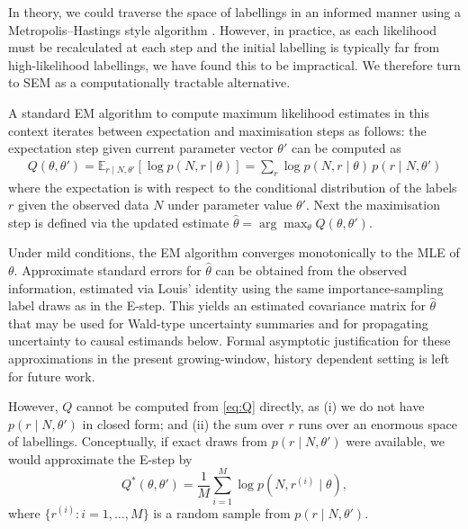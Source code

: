 \documentclass{statsoc}
\newcommand{\bbE}{\mathbb{E}}
\newcommand{\1}{\mathbbm{1}}
\begin{document}
In theory, we could traverse the space of labellings in an informed manner using a Metropolis--Hastings style algorithm \citep{hastings1970monte}. However, in practice, as each likelihood must be recalculated at each step and the initial labelling is typically far from high-likelihood labellings, we have found this to be impractical. We therefore turn to SEM as a computationally tractable alternative.

A standard EM algorithm to compute maximum likelihood estimates in this context iterates between expectation and maximisation steps as follows: the expectation step given current parameter vector $\theta'$ can be computed as
	\begin{align}
	Q(\theta,\theta') 
	= \bbE_{r \mid N, \theta'}\!\left[ \log p(N,r \mid \theta)\right]
	= \sum_{r} \log p(N,r \mid \theta)\, p(r \mid N, \theta')  \label{eq:Q}
	\end{align}
	where the expectation is with respect to the conditional distribution of the labels $r$ given the observed data $N$ under parameter value $\theta'$.
	Next the maximisation step is defined via the updated estimate
	\(
	\hat\theta = \arg\max_\theta Q(\theta,\theta').
	\)
    
Under mild conditions, the EM algorithm converges monotonically to the MLE of $\theta$. Approximate standard errors for \(\hat\theta\) can be obtained from the observed information, estimated via Louis' identity \citep{louis1982finding} using the same importance-sampling label draws as in the E-step. This yields an estimated covariance matrix for \(\hat\theta\) that may be used for Wald-type uncertainty summaries and for propagating uncertainty to causal estimands below. Formal asymptotic justification for these approximations in the present growing-window, history dependent setting is left for future work.

However, $Q$ cannot be computed from \eqref{eq:Q} directly, as (i) we do not have $p(r \mid N, \theta')$ in closed form; and (ii) the sum over $r$ runs over an enormous space of labellings. Conceptually, if exact draws from \(p(r\mid N,\theta')\) were available, we would approximate the E-step by
\begin{equation}
Q^*(\theta,\theta') = \frac{1}{M}\sum_{i=1}^M \log p(N,r^{(i)}\mid \theta), \label{eq:Qstar}
\end{equation}
where $\{r^{(i)}\colon i =1,\ldots,M\}$ is a random sample from $p(r \mid N, \theta')$.
\end{document}
